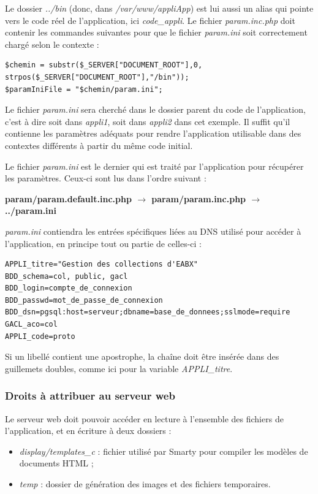 Le dossier \textit{../bin} (donc, dans\textit{ /var/www/appliApp}) est lui aussi un alias qui pointe vers le code réel de l’application, ici \textit{code\_appli}. Le fichier \textit{param.inc.php} doit contenir les commandes suivantes pour que le fichier \textit{param.ini} soit correctement chargé selon le contexte :
\begin{lstlisting}
$chemin = substr($_SERVER["DOCUMENT_ROOT"],0, strpos($_SERVER["DOCUMENT_ROOT"],"/bin"));
$paramIniFile = "$chemin/param.ini";
\end{lstlisting}

Le fichier \textit{param.ini} sera cherché dans le dossier parent du code de l’application, c’est à dire soit dans \textit{appli1}, soit dans \textit{appli2} dans cet exemple. Il suffit qu’il contienne les paramètres adéquats pour rendre l’application utilisable dans des contextes différents à partir du même code initial.

Le fichier \textit{param.ini} est le dernier qui est traité par l'application pour récupérer les paramètres. Ceux-ci sont lus dans l'ordre suivant :

\textbf{param/param.default.inc.php $\rightarrow$ param/param.inc.php $\rightarrow$ ../param.ini}

\textit{param.ini} contiendra les entrées spécifiques liées au DNS utilisé pour accéder à l'application, en principe tout ou partie de celles-ci :
\begin{lstlisting}
APPLI_titre="Gestion des collections d'EABX"
BDD_schema=col, public, gacl
BDD_login=compte_de_connexion
BDD_passwd=mot_de_passe_de_connexion
BDD_dsn=pgsql:host=serveur;dbname=base_de_donnees;sslmode=require
GACL_aco=col
APPLI_code=proto
\end{lstlisting}

Si un libellé contient une apostrophe, la chaîne doit être insérée dans des guillemets doubles, comme ici pour la variable \textit{APPLI\_titre}.


\subsubsection{Droits à attribuer au serveur web}
\label{droitsApache}
Le serveur web doit pouvoir accéder en lecture à l'ensemble des fichiers de l'application, et en écriture à deux dossiers :
\begin{itemize}
\item \textit{display/templates\_c} : fichier utilisé par Smarty pour compiler les modèles de documents HTML ;
\item \textit{temp} : dossier de génération des images et des fichiers temporaires.
\end{itemize}

